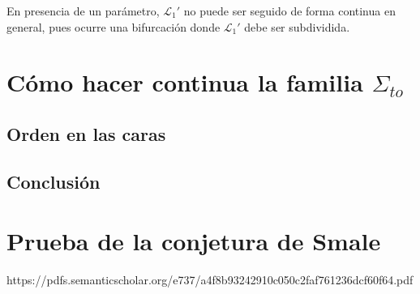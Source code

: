 \documentclass[twoside, 11pt]{article}
\newcommand{\LL}{\mathcal{L}}
\begin{document}
En presencia de un parámetro, $\LL_1'$ no puede ser seguido de forma continua en general, pues ocurre una bifurcación donde $\LL_1'$ debe ser subdividida. 

\section{Cómo hacer continua la familia $\Sigma_{to}$}




\subsection{Orden en las caras}
\subsection{Conclusión}


\section{Prueba de la conjetura de Smale}

\begin{thebibliography}{}
 https://pdfs.semanticscholar.org/e737/a4f8b93242910c050c2faf761236dcf60f64.pdf
\end{thebibliography}
\end{document}
